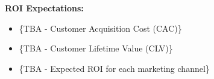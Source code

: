 \textbf{ROI Expectations:}
\begin{itemize}
    \item \{TBA - Customer Acquisition Cost (CAC)\}
    \item \{TBA - Customer Lifetime Value (CLV)\}
    \item \{TBA - Expected ROI for each marketing channel\}
\end{itemize}